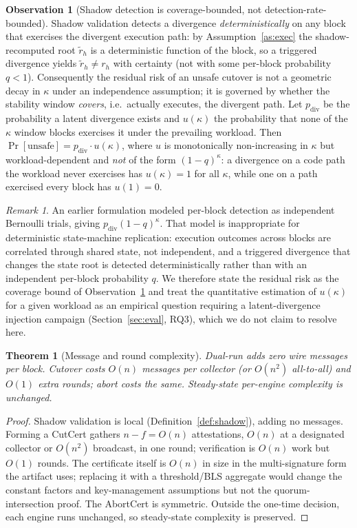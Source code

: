\documentclass[journal]{IEEEtran}
\newtheorem{theorem}{Theorem}
\theoremstyle{definition}
\newtheorem{observation}{Observation}
\theoremstyle{remark}
\newtheorem{remark}{Remark}
\begin{document}
\begin{observation}[Shadow detection is coverage-bounded, not detection-rate-bounded]
\label{th:detection}
Shadow validation detects a divergence \emph{deterministically} on any block that exercises the
divergent execution path: by Assumption~\ref{as:exec} the shadow-recomputed root $\tilde r_h$ is a
deterministic function of the block, so a triggered divergence yields $\tilde r_h\ne r_h$ with
certainty (not with some per-block probability $q<1$). Consequently the residual risk of an unsafe
cutover is not a geometric decay in $\kappa$ under an independence assumption; it is governed by
whether the stability window \emph{covers}, i.e.\ actually executes, the divergent path. Let
$p_{\mathrm{div}}$ be the probability a latent divergence exists and $u(\kappa)$ the probability that
none of the $\kappa$ window blocks exercises it under the prevailing workload. Then
$\Pr[\mathrm{unsafe}] = p_{\mathrm{div}}\cdot u(\kappa)$, where $u$ is monotonically non-increasing in
$\kappa$ but workload-dependent and \emph{not} of the form $(1-q)^{\kappa}$: a divergence on a code
path the workload never exercises has $u(\kappa)=1$ for all $\kappa$, while one on a path exercised
every block has $u(1)=0$.
\end{observation}

\begin{remark}
\label{rem:detection-indep}
An earlier formulation modeled per-block detection as independent Bernoulli trials, giving
$p_{\mathrm{div}}(1-q)^{\kappa}$. That model is inappropriate for deterministic state-machine
replication: execution outcomes across blocks are correlated through shared state, not independent,
and a triggered divergence that changes the state root is detected deterministically rather than
with an independent per-block probability $q$. We therefore state
the residual risk as the coverage bound of Observation~\ref{th:detection} and treat the quantitative
estimation of $u(\kappa)$ for a given workload as an empirical question requiring a latent-divergence
injection campaign (Section~\ref{sec:eval}, RQ3), which we do not claim to resolve here.
\end{remark}

\begin{theorem}[Message and round complexity]
\label{th:complexity}
Dual-run adds zero wire messages per block. Cutover costs $O(n)$ messages per collector (or
$O(n^2)$ all-to-all) and $O(1)$ extra rounds; abort costs the same. Steady-state per-engine
complexity is unchanged.
\end{theorem}
\begin{proof}
Shadow validation is local (Definition~\ref{def:shadow}), adding no messages. Forming a CutCert
gathers $n-f=O(n)$ attestations, $O(n)$ at a designated collector or $O(n^2)$ broadcast, in one
round; verification is $O(n)$ work but $O(1)$ rounds. The certificate itself is $O(n)$ in size in the
multi-signature form the artifact uses; replacing it with a threshold/BLS aggregate would change the
constant factors and key-management assumptions but not the quorum-intersection proof. The AbortCert
is symmetric. Outside the one-time decision, each engine runs unchanged, so steady-state
complexity is preserved.
\end{proof}
\end{document}
